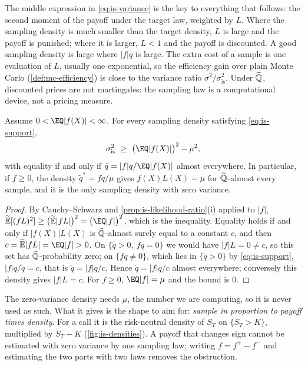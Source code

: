 The middle expression in \eqref{eq:is-variance} is the key to everything that follows: the
second moment of the payoff under the target law, weighted by $L$. Where the sampling
density is much smaller than the target density, $L$ is large and the payoff is punished;
where it is larger, $L<1$ and the payoff is discounted. A good sampling density is large
where $|f|q$ is large. The extra cost of a sample is one evaluation of $L$, usually one
exponential, so the efficiency gain over plain Monte Carlo (\cref{def:mc-efficiency}) is
close to the variance ratio $\sigma^2/\sigma^2_{\mathrm{is}}$. Under $\widetilde{\mathbb Q}$, discounted prices
are not martingales: the sampling law is a computational device, not a pricing measure.

\begin{proposition}\label{prop:is-zero-variance}
Assume $0<\EQ|f(X)|<\infty$. For every sampling density satisfying \eqref{eq:is-support},
\[
  \sigma^2_{\mathrm{is}}\ \ge\ \big(\EQ|f(X)|\big)^2-\mu^2 ,
\]
with equality if and only if $\tilde q=|f|q/\EQ|f(X)|$ almost everywhere. In particular, if
$f\ge0$, the density $\tilde q^*=fq/\mu$ gives $f(X)L(X)=\mu$ for $\widetilde{\mathbb Q}$-almost every sample,
and it is the only sampling density with zero variance.
\end{proposition}

\begin{proof}
By Cauchy--Schwarz and \cref{prop:is-likelihood-ratio}(i) applied to $|f|$,
$\Et[(fL)^2]\ge\big(\Et|fL|\big)^2=\big(\EQ|f|\big)^2$, which is the inequality. Equality
holds if and only if $|f(X)|L(X)$ is $\widetilde{\mathbb Q}$-almost surely equal to a constant $c$, and then
$c=\Et|fL|=\EQ|f|>0$. On $\{\tilde q>0,\ fq=0\}$ we would have $|f|L=0\ne c$, so this set
has $\widetilde{\mathbb Q}$-probability zero; on $\{fq\ne0\}$, which lies in $\{\tilde q>0\}$ by
\eqref{eq:is-support}, $|f|q/\tilde q=c$, that is $\tilde q=|f|q/c$. Hence
$\tilde q=|f|q/c$ almost everywhere; conversely this density gives $|f|L=c$. For $f\ge0$,
$\EQ|f|=\mu$ and the bound is $0$.
\end{proof}

The zero-variance density needs $\mu$, the number we are computing, so it is never used as
such. What it gives is the shape to aim for: \emph{sample in proportion to payoff times
density}. For a call it is the risk-neutral density of $S_T$ on $\{S_T>K\}$, multiplied by
$S_T-K$ (\cref{fig:is-densities}). A payoff that changes sign cannot be estimated with zero
variance by one sampling law; writing $f=f^+-f^-$ and estimating the two parts with two laws
removes the obstruction.

